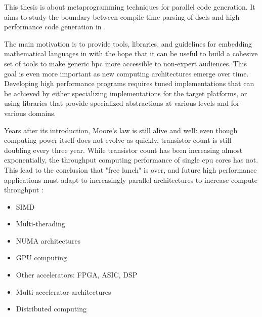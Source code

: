 \documentclass[main]{subfiles}
\begin{document}
This thesis is about metaprogramming techniques for parallel code generation.
It aims to study the boundary between compile-time parsing of
\glspl{dsel} and high performance code generation in \cpp.

The main motivation is to provide tools, libraries, and guidelines for embedding
mathematical languages in \cpp with the hope that it can be useful to build a
cohesive set of tools to make generic \gls{hpc} more accessible
to non-expert audiences. This goal is even more important as new computing
architectures emerge over time. Developing high performance programs requires
tuned implementations that can be achieved by either specializing
implementations for the target platforms, or using libraries that provide
specialized abstractions at various levels and for various domains.

Years after its introduction, Moore's law is still alive and well:
even though computing power itself does not evolve as quickly,
transistor count is still doubling every three year.
While transistor count has been increasing almost exponentially,
the throughput computing performance of single \gls{cpu} cores has not.
This lead to the conclusion that "free lunch" is over, and future
high performance applications must adapt to increasingly parallel architectures
to increase compute throughput
\cite{concurrency-revolution, doi:10.1142/S0129626404001829}:

\begin{itemize}
\item SIMD
\item Multi-therading
\item NUMA architectures
\item GPU computing
\item Other accelerators: FPGA, ASIC, DSP
\item Multi-accelerator architectures
\item Distributed computing
\end{itemize}
\end{document}
